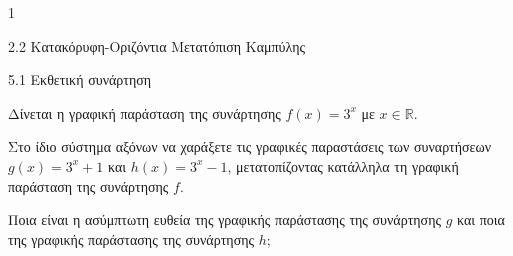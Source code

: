 \begin{ylh}{1}
\item 2.2 Κατακόρυφη-Οριζόντια Μετατόπιση Καμπύλης
\item 5.1 Εκθετική συνάρτηση
\end{ylh}
Δίνεται η γραφική παράσταση της συνάρτησης $f(x) = 3^x$ με $x \in \mathbb{R}$.
\begin{center}
\end{center}
\begin{alist}
\item Στο ίδιο σύστημα αξόνων να χαράξετε τις γραφικές παραστάσεις των συναρτήσεων $g(x) = 3^x + 1$ και $h(x) = 3^x - 1$, μετατοπίζοντας κατάλληλα τη γραφική παράσταση της συνάρτησης $f$.
\item Ποια είναι η ασύμπτωτη ευθεία της γραφικής παράστασης της συνάρτησης $g$ και ποια της γραφικής παράστασης της συνάρτησης $h$;
\end{alist}

